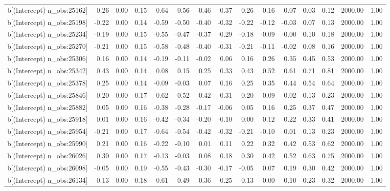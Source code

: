 \begin{table}[ht]
\begin{tabular}{rrrrrrrrrrrrrrr}
  b[(Intercept) n\_obs:25162] & -0.26 & 0.00 & 0.15 & -0.64 & -0.56 & -0.46 & -0.37 & -0.26 & -0.16 & -0.07 & 0.03 & 0.12 & 2000.00 & 1.00 \\ 
  b[(Intercept) n\_obs:25198] & -0.22 & 0.00 & 0.14 & -0.59 & -0.50 & -0.40 & -0.32 & -0.22 & -0.12 & -0.03 & 0.07 & 0.13 & 2000.00 & 1.00 \\ 
  b[(Intercept) n\_obs:25234] & -0.19 & 0.00 & 0.15 & -0.55 & -0.47 & -0.37 & -0.29 & -0.18 & -0.09 & -0.00 & 0.10 & 0.18 & 2000.00 & 1.00 \\ 
  b[(Intercept) n\_obs:25270] & -0.21 & 0.00 & 0.15 & -0.58 & -0.48 & -0.40 & -0.31 & -0.21 & -0.11 & -0.02 & 0.08 & 0.16 & 2000.00 & 1.00 \\ 
  b[(Intercept) n\_obs:25306] & 0.16 & 0.00 & 0.14 & -0.19 & -0.11 & -0.02 & 0.06 & 0.16 & 0.26 & 0.35 & 0.45 & 0.53 & 2000.00 & 1.00 \\ 
  b[(Intercept) n\_obs:25342] & 0.43 & 0.00 & 0.14 & 0.08 & 0.15 & 0.25 & 0.33 & 0.43 & 0.52 & 0.61 & 0.71 & 0.81 & 2000.00 & 1.00 \\ 
  b[(Intercept) n\_obs:25378] & 0.25 & 0.00 & 0.14 & -0.09 & -0.03 & 0.07 & 0.16 & 0.25 & 0.35 & 0.44 & 0.54 & 0.64 & 2000.00 & 1.00 \\ 
  b[(Intercept) n\_obs:25846] & -0.20 & 0.00 & 0.17 & -0.62 & -0.52 & -0.42 & -0.31 & -0.20 & -0.09 & 0.02 & 0.13 & 0.23 & 2000.00 & 1.00 \\ 
  b[(Intercept) n\_obs:25882] & 0.05 & 0.00 & 0.16 & -0.38 & -0.28 & -0.17 & -0.06 & 0.05 & 0.16 & 0.25 & 0.37 & 0.47 & 2000.00 & 1.00 \\ 
  b[(Intercept) n\_obs:25918] & 0.01 & 0.00 & 0.16 & -0.42 & -0.34 & -0.20 & -0.10 & 0.00 & 0.12 & 0.22 & 0.33 & 0.41 & 2000.00 & 1.00 \\ 
  b[(Intercept) n\_obs:25954] & -0.21 & 0.00 & 0.17 & -0.64 & -0.54 & -0.42 & -0.32 & -0.21 & -0.10 & 0.01 & 0.13 & 0.23 & 2000.00 & 1.00 \\ 
  b[(Intercept) n\_obs:25990] & 0.21 & 0.00 & 0.16 & -0.22 & -0.10 & 0.01 & 0.11 & 0.22 & 0.32 & 0.42 & 0.53 & 0.62 & 2000.00 & 1.00 \\ 
  b[(Intercept) n\_obs:26026] & 0.30 & 0.00 & 0.17 & -0.13 & -0.03 & 0.08 & 0.18 & 0.30 & 0.42 & 0.52 & 0.63 & 0.75 & 2000.00 & 1.00 \\ 
  b[(Intercept) n\_obs:26098] & -0.05 & 0.00 & 0.19 & -0.55 & -0.43 & -0.30 & -0.17 & -0.05 & 0.07 & 0.19 & 0.30 & 0.42 & 2000.00 & 1.00 \\ 
  b[(Intercept) n\_obs:26134] & -0.13 & 0.00 & 0.18 & -0.61 & -0.49 & -0.36 & -0.25 & -0.13 & -0.00 & 0.10 & 0.23 & 0.32 & 2000.00 & 1.00 \\ 

\end{tabular}
\end{table}
